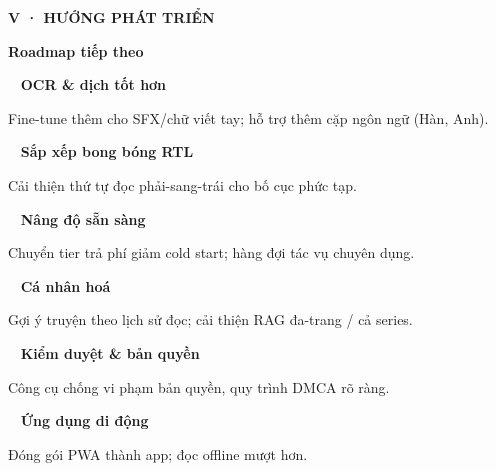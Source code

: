 \documentclass[aspectratio=169,10pt]{beamer}
\newcommand{\kick}[1]{{\headfont\bfseries\footnotesize\textcolor{mred}{\MakeUppercase{#1}}}}
\newcommand{\slidehead}[2]{%
  \kick{#1}\par\vspace{0.6mm}%
  {\headfont\bfseries\LARGE\textcolor{ink}{#2}}\par\vspace{1.2mm}}
\newcommand{\arr}{\textcolor{mred}{\,\raisebox{0.1ex}{$\rightarrow$}\,}}
\begin{document}
\begin{frame}
\slidehead{V · Hướng phát triển}{Roadmap tiếp theo}
\vspace{0.5mm}\footnotesize
\begin{tcbraster}[raster columns=3, raster equal height=rows, raster column skip=2.5mm, raster row skip=2mm]
\begin{tcolorbox}[card]{\headfont\bfseries\color{mred}\arr\ OCR \& dịch tốt hơn}\par\textcolor{slate}{Fine-tune thêm cho SFX/chữ viết tay; hỗ trợ thêm cặp ngôn ngữ (Hàn, Anh).}\end{tcolorbox}
\begin{tcolorbox}[creamcard]{\headfont\bfseries\color{mred}\arr\ Sắp xếp bong bóng RTL}\par\textcolor{slate}{Cải thiện thứ tự đọc phải-sang-trái cho bố cục phức tạp.}\end{tcolorbox}
\begin{tcolorbox}[card]{\headfont\bfseries\color{mred}\arr\ Nâng độ sẵn sàng}\par\textcolor{slate}{Chuyển tier trả phí giảm cold start; hàng đợi tác vụ chuyên dụng.}\end{tcolorbox}
\begin{tcolorbox}[creamcard]{\headfont\bfseries\color{mred}\arr\ Cá nhân hoá}\par\textcolor{slate}{Gợi ý truyện theo lịch sử đọc; cải thiện RAG đa-trang / cả series.}\end{tcolorbox}
\begin{tcolorbox}[card]{\headfont\bfseries\color{mred}\arr\ Kiểm duyệt \& bản quyền}\par\textcolor{slate}{Công cụ chống vi phạm bản quyền, quy trình DMCA rõ ràng.}\end{tcolorbox}
\begin{tcolorbox}[creamcard]{\headfont\bfseries\color{mred}\arr\ Ứng dụng di động}\par\textcolor{slate}{Đóng gói PWA thành app; đọc offline mượt hơn.}\end{tcolorbox}
\end{tcbraster}
\end{frame}
\end{document}
